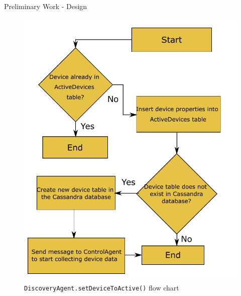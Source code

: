 \documentclass{beamer}
\begin{document}
\begin{frame}{Preliminary Work - Design}{}
    \begin{figure}
        \centering
        \includegraphics[scale=0.35]{figs/agents/setDeviceToActiveFlow.pdf}
        \caption{\texttt{DiscoveryAgent.setDeviceToActive()} flow chart}
        \label{fig:setDeviceToActiveFlow}
    \end{figure}
\end{frame}
\end{document}
